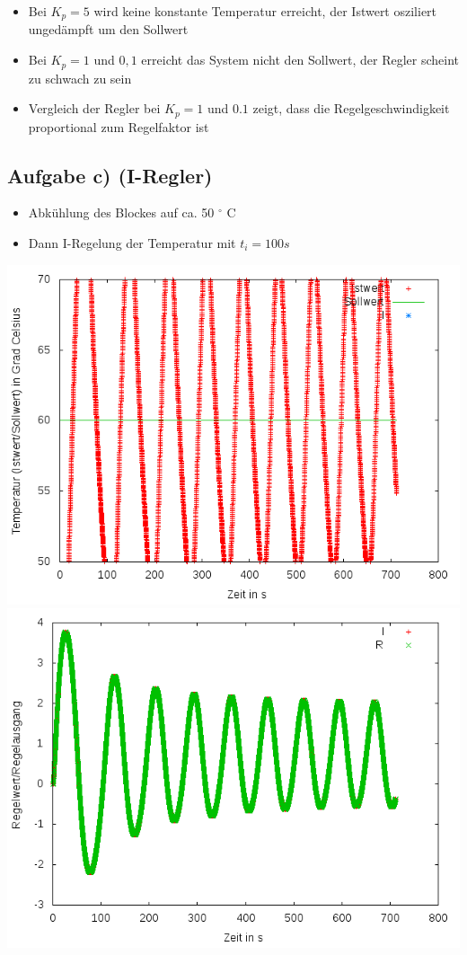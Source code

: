 \documentclass[compress,11pt]{beamer}
\begin{document}
\begin{frame}
\begin{itemize}
\item Bei $K_p = 5$ wird keine konstante Temperatur erreicht, der Istwert osziliert ungedämpft um den Sollwert
\item Bei $K_p = 1$ und $0,1$ erreicht das System nicht den Sollwert, der Regler scheint zu schwach zu sein
\item Vergleich der Regler bei $K_p = 1$ und $0.1$ zeigt, dass die Regelgeschwindigkeit proportional zum Regelfaktor ist 
\end{itemize}
\end{frame}
\subsection{Aufgabe c) (I-Regler)}
\begin{frame}
\begin{itemize}
\item Abkühlung des Blockes auf ca. 50 $^\circ$ C
\item Dann I-Regelung der Temperatur mit $t_i = 100 s$
\end{itemize}
\includegraphics[width=.5\textwidth]{../2aufgabe/2c1}
\includegraphics[width=.5\textwidth]{../2aufgabe/2c1_I}
\end{frame}
\end{document}
